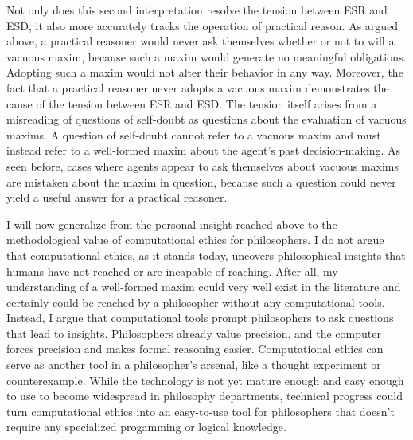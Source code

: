 \begin{isabellebody}
\begin{isamarkuptext}
Not only does this second interpretation resolve the tension between ESR and ESD, it also more accurately 
tracks the operation of practical reason. As argued above, a practical reasoner would never ask themselves 
whether or not to will a vacuous maxim, because such a maxim would generate no meaningful obligations. 
Adopting such a maxim would not alter their behavior in any way. Moreover, the fact that a practical 
reasoner never adopts a vacuous maxim demonstrates the cause of the tension between ESR and ESD.
The tension itself arises from a misreading of questions of self-doubt as questions about 
the evaluation of vacuous maxims. A question of self-doubt cannot refer to a vacuous maxim and must 
instead refer to a well-formed maxim about the agent's past decision-making. As seen before, cases where 
agents appear to ask themselves about vacuous maxims are mistaken about the maxim in question, because 
such a question could never yield a useful answer for a practical reasoner.%
\end{isamarkuptext}\isamarkuptrue%
%
\isadelimdocument
%
\endisadelimdocument
%
\isatagdocument
%
\isamarkuptrue%
%
\endisatagdocument
{\isafolddocument}%
%
\isadelimdocument
%
\endisadelimdocument
%
\begin{isamarkuptext}%
I will now generalize from the personal insight reached above to the methodological value of 
computational ethics for philosophers.
I do not argue that computational ethics, as it stands today, uncovers philosophical insights that humans have not reached
or are incapable of reaching. After all, my understanding of a well-formed maxim could 
very well exist in the literature and certainly could be reached by a philosopher without any 
computational tools. Instead, I argue that computational tools prompt philosophers to ask questions that 
lead to insights. Philosophers already value precision, and the computer forces precision and makes formal
reasoning easier. Computational 
ethics can serve as another tool in a philosopher's arsenal, like a thought experiment or counterexample.
While the technology is not yet mature enough and easy enough to use to become widespread in philosophy
departments, technical progress could turn computational ethics into an easy-to-use tool for philosophers
that doesn't require any specialized progamming or logical knowledge.


\end{isamarkuptext}
\end{isabellebody}
